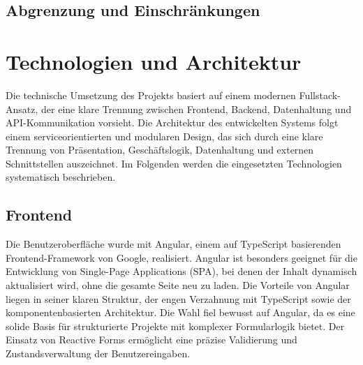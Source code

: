 \documentclass[a4paper,12pt]{article}
\begin{document}
\subsection{Abgrenzung und Einschränkungen}

\newpage


\section{Technologien und Architektur}
Die technische Umsetzung des Projekts basiert auf einem modernen Fullstack-Ansatz, der eine klare Trennung zwischen Frontend, Backend, Datenhaltung und API-Kommunikation vorsieht. Die Architektur des entwickelten Systems folgt einem serviceorientierten und modularen Design, das sich durch eine klare Trennung von Präsentation, Geschäftslogik, Datenhaltung und externen Schnittstellen auszeichnet. Im Folgenden werden die eingesetzten Technologien systematisch beschrieben.
\subsection{Frontend}
Die Benutzeroberfläche wurde mit Angular, einem auf TypeScript basierenden Frontend-Framework von Google, realisiert. Angular ist besonders geeignet für die Entwicklung von Single-Page Applications (SPA), bei denen der Inhalt dynamisch aktualisiert wird, ohne die gesamte Seite neu zu laden. Die Vorteile von Angular liegen in seiner klaren Struktur, der engen Verzahnung mit TypeScript sowie der komponentenbasierten Architektur. Die Wahl fiel bewusst auf Angular, da es eine solide Basis für strukturierte Projekte mit komplexer Formularlogik bietet. Der Einsatz von Reactive Forms ermöglicht eine präzise Validierung und Zustandsverwaltung der Benutzereingaben.
\end{document}
